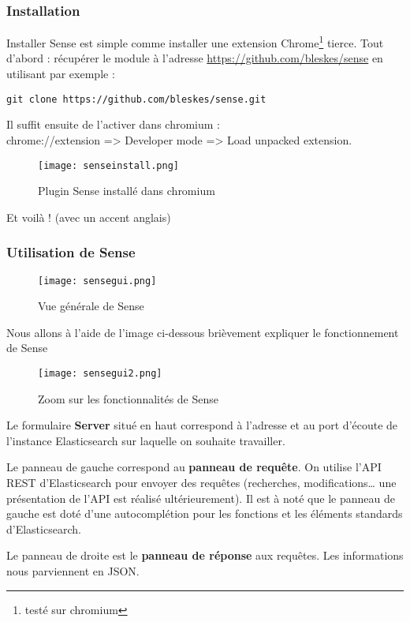 \subsubsection{Installation}
Installer Sense est simple comme installer une extension 
Chrome\footnote{testé sur chromium} tierce.
Tout d'abord : récupérer le module à l'adresse \url{https://github.com/bleskes/sense}
en utilisant par exemple : 
\begin{lstlisting}[style=code,label=lst:gitclonesense]
git clone https://github.com/bleskes/sense.git
\end{lstlisting}

Il suffit ensuite de l'activer dans chromium :\\ 
chrome://extension => Developer mode => Load unpacked extension.
\begin{figure}[H]
\center
\texttt{[image: senseinstall.png]}
\label{fig:senseinstall}
\caption{Plugin Sense installé dans chromium}
\end{figure}
Et voilà ! \footnotesize{(avec un accent anglais)}
\subsubsection{Utilisation de Sense}

\begin{figure}[H]
\center
\texttt{[image: sensegui.png]}
\label{fig:sensegui}
\caption{Vue générale de Sense}
\end{figure}

Nous allons à l'aide de l'image ci-dessous brièvement expliquer le fonctionnement de Sense
\begin{figure}[H]
\center
\texttt{[image: sensegui2.png]}
\label{fig:sensegui2.png}
\caption{Zoom sur les fonctionnalités de Sense}
\end{figure}
Le formulaire \textbf{Server} situé en haut correspond à l'adresse et au port d'écoute 
de l'instance Elasticsearch sur laquelle on souhaite travailler.

Le panneau de gauche correspond au \textbf{panneau de requête}. On utilise l'API 
REST d'Elasticsearch pour envoyer des requêtes (recherches, modifications\ldots 
une présentation de l'API est réalisé ultérieurement). Il est à noté que le panneau 
de gauche est doté d'une autocomplétion pour les fonctions et les éléments standards 
d'Elasticsearch.

Le panneau de droite est le \textbf{panneau de réponse} aux requêtes. Les informations
nous parviennent en JSON.

